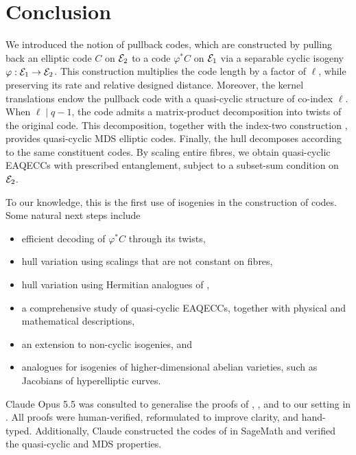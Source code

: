 \documentclass[twocolumn, 11pt]{scrartcl}
\begin{document}
\section{Conclusion} \label{section:conclusion}

We introduced the notion of pullback codes, which are constructed by pulling back an elliptic code $C$ on $\mathcal{E}_2$ to a code $\varphi^*C$ on $\mathcal{E}_1$ via a separable cyclic isogeny $\varphi:\mathcal{E}_1\to \mathcal{E}_2$. This construction multiplies the code length by a factor of $\ell$, while preserving its rate and relative designed distance. Moreover, the kernel translations endow the pullback code with a quasi-cyclic structure of co-index $\ell$. When $\ell\mid q-1$, the code admits a matrix-product decomposition into twists of the original code. This decomposition, together with the index-two construction \cite{wang2025nonrs}, provides quasi-cyclic MDS elliptic codes. Finally, the hull decomposes according to the same constituent codes. By scaling entire fibres, we obtain quasi-cyclic EAQECCs with prescribed entanglement, subject to a subset-sum condition on $\mathcal{E}_2$.

To our knowledge, this is the first use of isogenies in the construction of codes. Some natural next steps include
\begin{itemize}
    \item efficient decoding of $\varphi^*C$ through its twists,
    \item hull variation using scalings that are not constant on fibres,
    \item hull variation using Hermitian analogues of ,
    \item a comprehensive study of quasi-cyclic EAQECCs, together with physical and mathematical descriptions,
    \item an extension to non-cyclic isogenies, and
    \item analogues for isogenies of higher-dimensional abelian varieties, such as Jacobians of hyperelliptic curves.
\end{itemize}

\printbibliography


Claude Opus 5.5 was consulted to generalise the proofs of \cite[Prop.~4.1, Thm.~4.2]{ling2001algebraic}, \cite[Lem.~3--4]{wang2026generic}, and \cite[Thm.~1(i)]{fang2020euclidean} to our setting in . All proofs were human-verified, reformulated to improve clarity, and hand-typed. Additionally, Claude constructed the codes of  in SageMath \cite{code-f256,code-f64} and verified the quasi-cyclic and MDS properties.
\end{document}
